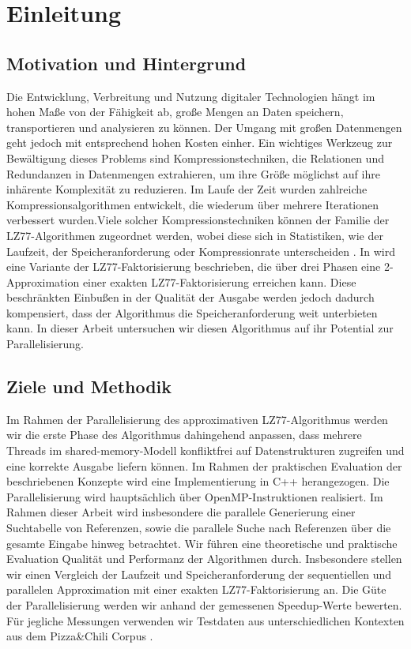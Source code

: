 \chapter{Einleitung}
\section{Motivation und Hintergrund}
Die Entwicklung, Verbreitung und Nutzung digitaler Technologien hängt im hohen Maße von der Fähigkeit ab, große Mengen an Daten speichern, transportieren und
analysieren zu können. Der Umgang mit großen Datenmengen geht jedoch mit entsprechend hohen Kosten einher. Ein wichtiges Werkzeug zur Bewältigung dieses Problems
sind Kompressionstechniken, die Relationen und Redundanzen in Datenmengen extrahieren, um ihre Größe möglichst auf ihre inhärente Komplexität zu reduzieren. 
Im Laufe der Zeit wurden zahlreiche Kompressionsalgorithmen entwickelt, die wiederum über mehrere Iterationen verbessert wurden.Viele solcher Kompressionstechniken
können der Familie der LZ77-Algorithmen zugeordnet werden, wobei diese sich in Statistiken, wie der Laufzeit, der Speicheranforderung oder Kompressionrate unterscheiden
\cite{LemZiv}. In \cite{ApproxLZ77} wird eine Variante der LZ77-Faktorisierung beschrieben, die über drei Phasen eine 2-Approximation einer exakten LZ77-Faktorisierung
\cite{exactLemZiv} erreichen kann. Diese beschränkten Einbußen in der Qualität der Ausgabe werden jedoch dadurch kompensiert, dass der Algorithmus die Speicheranforderung
weit unterbieten kann. In dieser Arbeit untersuchen wir diesen Algorithmus auf ihr Potential zur Parallelisierung.

\section{Ziele und Methodik}
Im Rahmen der Parallelisierung des approximativen LZ77-Algorithmus werden wir die erste Phase des Algorithmus dahingehend anpassen, dass mehrere Threads im 
shared-memory-Modell konfliktfrei auf Datenstrukturen zugreifen und eine korrekte Ausgabe liefern können. Im Rahmen der praktischen Evaluation der
beschriebenen Konzepte wird eine Implementierung in C++ herangezogen. Die Parallelisierung wird hauptsächlich über OpenMP-Instruktionen \cite{openmp} realisiert.
Im Rahmen dieser Arbeit wird insbesondere die parallele Generierung einer Suchtabelle von Referenzen, sowie die parallele Suche nach Referenzen über die gesamte Eingabe
hinweg betrachtet. Wir führen eine theoretische und praktische Evaluation Qualität und Performanz der Algorithmen durch. Insbesondere stellen wir einen Vergleich der
Laufzeit und Speicheranforderung der sequentiellen und parallelen Approximation mit einer exakten LZ77-Faktorisierung an. Die Güte der Parallelisierung werden wir anhand
der gemessenen Speedup-Werte bewerten. Für jegliche Messungen verwenden wir Testdaten aus unterschiedlichen Kontexten aus dem Pizza\&Chili Corpus \cite{corpus}.